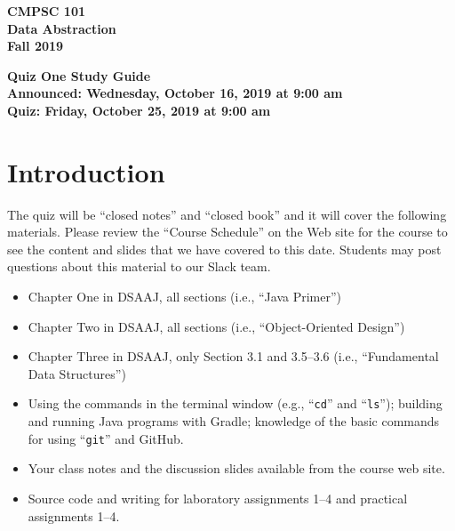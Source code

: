 \documentclass[11pt]{article}
\newcommand{\assignmentduedate}{October 25}
\newcommand{\assignmentassignedate}{October 16}
\newcommand{\assignmentnumber}{One}
\newcommand{\labyear}{2019}
\newcommand{\assignedday}{Wednesday}
\newcommand{\dueday}{Friday}
\newcommand{\labtime}{9:00 am}
\newcommand{\assigneddate}{Announced: \assignedday, \assignmentassignedate, \labyear{} at \labtime{}}
\newcommand{\duedate}{Quiz: \dueday, \assignmentduedate, \labyear{} at \labtime{}}
\newcommand{\command}[1]{``\lstinline{#1}''}
\newcommand{\guidetitle}[1]
{
  \begin{center}
    \begin{center}
      \bf
      CMPSC 101\\Data Abstraction\\
      Fall 2019\\
      \medskip
    \end{center}
    \bf
    #1
  \end{center}
}
\begin{document}
\thispagestyle{empty}

\guidetitle{Quiz \assignmentnumber{} Study Guide \\ \assigneddate{} \\ \duedate{}}

\section*{Introduction}

\noindent The quiz will be ``closed notes'' and ``closed book'' and it will
cover the following materials. Please review the ``Course Schedule'' on the Web
site for the course to see the content and slides that we have covered to this
date. Students may post questions about this material to our Slack team.

\begin{itemize}

  \itemsep 0in

  \item Chapter One in DSAAJ, all sections (i.e., ``Java Primer'')

  \item Chapter Two in DSAAJ, all sections (i.e., ``Object-Oriented Design'')

  \item Chapter Three in DSAAJ, only Section 3.1 and 3.5--3.6 (i.e.,
    ``Fundamental Data Structures'')



  \item Using the commands in the terminal window (e.g., \command{cd} and
    \command{ls}); building and running Java programs with Gradle; knowledge of
    the basic commands for using \command{git} and GitHub.

  \item Your class notes and the discussion slides available from the course web
    site.

  \item Source code and writing for laboratory assignments 1--4 and practical
    assignments 1--4.

\end{itemize}
\end{document}
